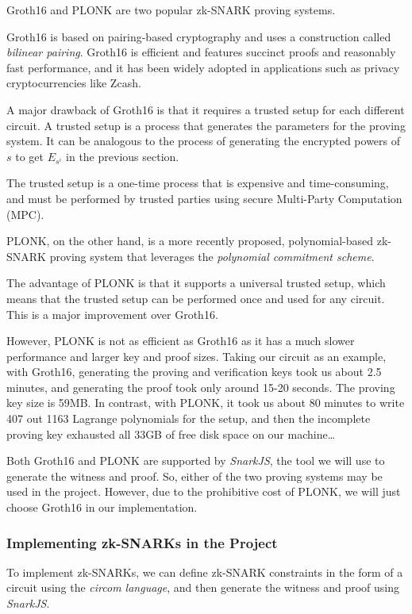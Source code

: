 \documentclass[
]{report}
\begin{document}
Groth16 and PLONK are two popular zk-SNARK proving systems.

Groth16 is based on pairing-based cryptography and uses a construction
called \emph{bilinear pairing}. Groth16 is efficient and features
succinct proofs and reasonably fast performance, and it has been widely
adopted in applications such as privacy cryptocurrencies like Zcash.

A major drawback of Groth16 is that it requires a trusted setup for each
different circuit. A trusted setup is a process that generates the
parameters for the proving system. It can be analogous to the process of
generating the encrypted powers of \(s\) to get \(E_{s^{i}}\) in the
previous section.

The trusted setup is a one-time process that is expensive and
time-consuming, and must be performed by trusted parties using secure
Multi-Party Computation (MPC).

PLONK, on the other hand, is a more recently proposed, polynomial-based
zk-SNARK proving system that leverages the \emph{polynomial commitment
scheme}.

The advantage of PLONK is that it supports a universal trusted setup,
which means that the trusted setup can be performed once and used for
any circuit. This is a major improvement over Groth16.

However, PLONK is not as efficient as Groth16 as it has a much slower
performance and larger key and proof sizes. Taking our circuit as an
example, with Groth16, generating the proving and verification keys took
us about 2.5 minutes, and generating the proof took only around 15-20
seconds. The proving key size is 59MB. In contrast, with PLONK, it took
us about 80 minutes to write 407 out 1163 Lagrange polynomials for the
setup, and then the incomplete proving key exhausted all 33GB of free
disk space on our machine\ldots{}

Both Groth16 and PLONK are supported by \emph{SnarkJS}, the tool we will
use to generate the witness and proof. So, either of the two proving
systems may be used in the project. However, due to the prohibitive cost
of PLONK, we will just choose Groth16 in our implementation.

\subsubsection{Implementing zk-SNARKs in the Project}

To implement zk-SNARKs, we can define zk-SNARK constraints in the form
of a circuit using the \emph{circom language}, and then generate the
witness and proof using \emph{SnarkJS}.
\end{document}
